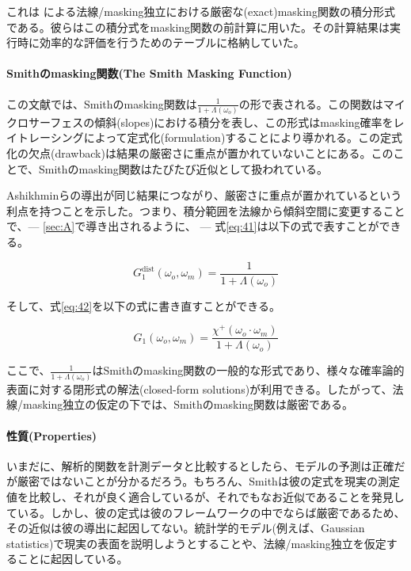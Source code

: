 \documentclass[a4j,xelatex,ja=standard]{bxjsarticle}
\begin{document}
これは\citeauthor{Ashikmin2000} \cite{Ashikmin2000}による法線/masking独立における厳密な(exact)masking関数の積分形式である。彼らはこの積分式をmasking関数の前計算に用いた。その計算結果は実行時に効率的な評価を行うためのテーブルに格納していた。

\paragraph{Smithのmasking関数(The Smith Masking Function)}

この文献では、Smithのmasking関数は$\frac{1}{1 + \Lambda(\omega_o)}$の形で表される。この関数はマイクロサーフェスの傾斜(slopes)における積分を表し、この形式はmasking確率をレイトレーシングによって定式化(formulation)することにより導かれる\cite{Walter2007}。この定式化の欠点(drawback)は結果の厳密さに重点が置かれていないことにある。このことで、Smithのmasking関数はたびたび近似として扱われている。

Ashikhminらの導出が同じ結果につながり、厳密さに重点が置かれているという利点を持つことを示した。つまり、積分範囲を法線から傾斜空間に変更することで、--- \ref{sec:A}で導き出されるように、 --- 式\eqref{eq:41}は以下の式で表すことができる。

\begin{equation*}
    G_1^{\text{dist}}(\omega_o, \omega_m) = \frac{1}{1 + \Lambda(\omega_o)}
\end{equation*}

そして、式\eqref{eq:42}を以下の式に書き直すことができる。

\begin{equation}
    \boxed{
    G_1(\omega_o, \omega_m) = \frac{\chi^+(\omega_o \cdot \omega_m)}{1 + \Lambda(\omega_o)}
    }
    \label{eq:43}
\end{equation}

ここで、$\frac{1}{1 + \Lambda(\omega_o)}$はSmithのmasking関数の一般的な形式であり\cite{Brown1980,Walter2007}、様々な確率論的表面に対する閉形式の解法(closed-form solutions)が利用できる。したがって、法線/masking独立の仮定の下では、Smithのmasking関数は厳密である。

\paragraph{性質(Properties)}

いまだに、解析的関数を計測データと比較するとしたら、モデルの予測は正確だが厳密ではないことが分かるだろう。もちろん、Smithは彼の定式を現実の測定値を比較し、それが良く適合しているが、それでもなお近似であることを発見している。しかし、彼の定式は彼のフレームワークの中でならば厳密であるため、その近似は彼の導出に起因してない。統計学的モデル(例えば、Gaussian statistics)で現実の表面を説明しようとすることや、法線/masking独立を仮定することに起因している。
\end{document}

